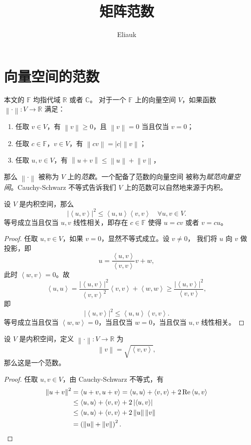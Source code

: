 \documentclass[fontset=none,zihao=-4]{Notes}
\title{\sffamily 矩阵范数}
\author{Eliauk}
\DeclareMathOperator\re{Re}
\newcommand{\inn}[1]{\left\langle#1\right\rangle}
\newcommand{\norm}[1]{\left\lVert#1\right\rVert}
\begin{document}
\maketitle

\tableofcontents

\section{向量空间的范数}

本文的 $\mathbb{F}$ 均指代域 $\mathbb{R}$ 或者 $\mathbb{C}$。
对于一个 $\mathbb{F}$ 上的向量空间 $V$，如果函数 $\norm{\cdot}:V\to\mathbb{R}$
满足：
\begin{enumerate}
  \item 任取 $v\in V$，有 $\norm{v}\geq 0$，且 $\norm{v}=0$ 当且仅当 $v=0$；
  \item 任取 $c\in\mathbb{F}$，$v\in V$，有 $\norm{cv}=|c|\norm{v}$；
  \item 任取 $u,v\in V$，有 $\norm{u+v}\leq\norm{u}+\norm{v}$，
\end{enumerate}
那么 $\norm{\cdot}$ 被称为 $V$ 上的\emph{范数}。一个配备了范数的向量空间
被称为\emph{赋范向量空间}。Cauchy-Schwarz 不等式告诉我们 $V$ 上的范数可以自然地来源于内积。

\begin{theorem}
  设 $V$ 是内积空间，那么
  \[
    \left|\inn{u,v}\right|^2\leq\inn{u,u}\inn{v,v}\quad \forall u,v\in V.
  \]
  等号成立当且仅当 $u,v$ 线性相关，即存在 $c\in\mathbb{F}$ 使得 $u=cv$
  或者 $v=cu$。
\end{theorem}
\begin{proof}
  任取 $u,v\in V$，如果 $v=0$，显然不等式成立。设 $v\neq 0$，
  我们将 $u$ 向 $v$ 做投影，即
  \[
    u=\frac{\inn{u,v}}{\inn{v,v}}v+w,  
  \]
  此时 $\inn{w,v}=0$。故
  \[
    \inn{u,u}=\frac{\left|\inn{u,v}\right|^2}{\inn{v,v}^2}\inn{v,v}+\inn{w,w}
    \geq \frac{\left|\inn{u,v}\right|^2}{\inn{v,v}},
  \]
  即
  \[
    \left|\inn{u,v}\right|^2\leq\inn{u,u}\inn{v,v}.
  \]
  等号成立当且仅当 $\inn{w,w}=0$，当且仅当 $w=0$，当且仅当 $u,v$ 线性相关。
\end{proof}

\begin{corollary}
  设 $V$ 是内积空间，定义 $\norm{\cdot}:V\to\mathbb{R}$ 为
  \[
    \norm{v}=\sqrt{\inn{v,v}} , 
  \]
  那么这是一个范数。
\end{corollary}
\begin{proof}
  任取 $u,v\in V$，由 Cauchy-Schwarz 不等式，有 
  \begin{align*}
    \norm{u+v}^2&=\inn{u+v,u+v}  =\inn{u,u}+\inn{v,v}+2\re\inn{u,v}\\
    &\leq \inn{u,u}+\inn{v,v}+2\left|\inn{u,v}\right|\\
    &\leq \inn{u,u}+\inn{v,v}+2\norm{u}\norm{v}\\
    &=\left(\norm{u}+\norm{v}\right)^2.\qedhere
  \end{align*}
\end{proof}
\end{document}
